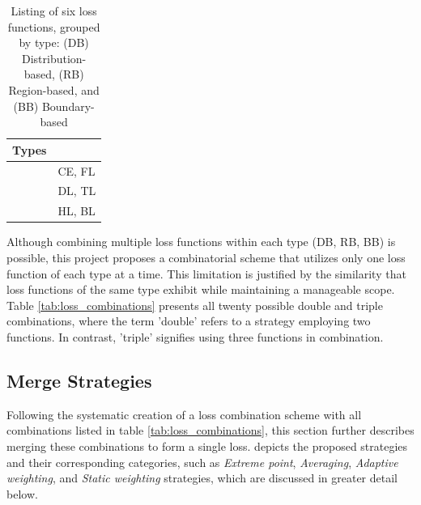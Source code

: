 \begin{table}[H]
  \centering
  \begin{tabular}{|l|l|}
    \hline
    \rowcolor[HTML]{000000}
    {\color[HTML]{FFFFFF} Types}                        & \multicolumn{1}{c|}{\cellcolor[HTML]{000000}{\color[HTML]{FFFFFF} Names}} \\ \hline
    \cellcolor[HTML]{6638B6}{\color[HTML]{FFFFFF} (DB)} & \acf{CE}, \acf{FL}                                            \\ \hline
    \cellcolor[HTML]{00A9CE}{\color[HTML]{FFFFFF} (RB)} & \acf{DL}, \acf{TL}                                                   \\ \hline
    \cellcolor[HTML]{99DDFD}{\color[HTML]{FFFFFF} (BB)} & \acf{HL}, \acf{BL}                                             \\ \hline
  \end{tabular}
  \caption[Loss function list]{Listing of six loss functions, grouped by type: (DB) Distribution-based, (RB) Region-based, and (BB) Boundary-based}\label{tab:loss_listing}
\end{table}

Although combining multiple loss functions within each type (DB, RB, BB) is possible, this project proposes a combinatorial scheme that utilizes only one loss function of each type at a time. This limitation is justified by the similarity that loss functions of the same type exhibit while maintaining a manageable scope. Table \ref{tab:loss_combinations} presents all twenty possible double and triple combinations, where the term 'double' refers to a strategy employing two functions. In contrast, 'triple' signifies using three functions in combination.



\subsection{Merge Strategies}
\label{sec:merge_strategies}

\label{subsec:strategy_types}
Following the systematic creation of a loss combination scheme with all combinations listed in table \ref{tab:loss_combinations}, this section further describes merging these combinations to form a single loss.  depicts the proposed strategies and their corresponding categories, such as \emph{Extreme point}, \emph{Averaging}, \emph{Adaptive weighting}, and \emph{Static weighting} strategies, which are discussed in greater detail below.

